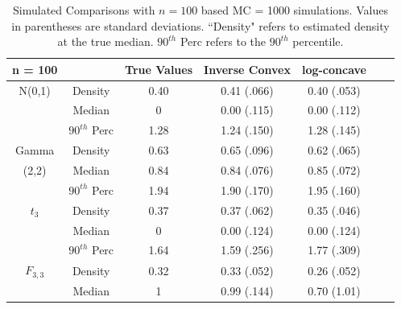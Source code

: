 \documentclass[11pt]{article}
\numberwithin{equation}{section}
\begin{document}
\begin{table}

{

\begin{center}	
\caption[Simulated Comparisons for Inverse Convex and Log-concave Estimators with $n = 100$]{Simulated Comparisons with $n = 100$ based MC = 1000 simulations. Values in parentheses are standard deviations. ``Density" refers to estimated density at the true median. $90^{th}$ Perc refers to the $90^{th}$ percentile.}

\begin{tabular} {| c | c | c | c | c | c | c |} 


	 \hline
	 
	 n = 100 		& 			&	True Values	& Inverse Convex		&	log-concave	\\
	 
	 \hline
	 
	N(0,1) 		& Density		& 	0.40			& 	0.41 (.066)		&	0.40 (.053)	\\
	 
	 
		 		& Median 		&	0			& 	0.00 (.115)		&	0.00 (.112)	  \\ 
					
				& $90^{th}$ Perc&	1.28			& 	1.24 (.150)		&	1.28 (.145)	\\
	
	\hline

	 
	 Gamma	 	& Density		& 	0.63			& 	0.65 (.096)		&	0.62 (.065)	\\
	 
	 
	 (2,2)			& Median 		&	0.84			& 	0.84 (.076)		& 	0.85 (.072)	 \\ 
				
				& $90^{th}$ Perc&	1.94			& 	1.90 (.170)		&	1.95 (.160)	 \\
	
	\hline
		
	 
	 $t_3$	 	& Density		& 	0.37			& 	0.37 (.062)		&	0.35 (.046)	\\
	 
	 
	 			& Median 		&	0			& 	0.00 (.124)		& 	0.00 (.124)	  \\ 
				
				& $90^{th}$ Perc&	1.64			& 	1.59 (.256)		&	1.77 (.309)	 \\
	
	\hline
	
		 
	 $F_{3,3}$	 	& Density		& 	0.32			&  	0.33 (.052)		&	0.26 (.052)	\\
	 
	 
	 			& Median 		&	1			& 	0.99 (.144)		& 	0.70 (1.01)	 \\ 
				

\end{tabular}
\end{center}}
\end{table}
\end{document}
